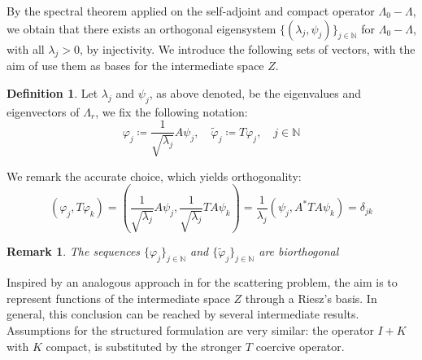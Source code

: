\documentclass[10pt, a4paper, twoside, openright]{book}
\theoremstyle{definition}
\newtheorem{definition}[subsection]{Definition}
\theoremstyle{plain}
\theoremstyle{plain}
\theoremstyle{plain}
\theoremstyle{plain}
\newtheorem{remark}[subsection]{Remark}
\theoremstyle{plain}
\theoremstyle{plain}
\theoremstyle{plain}
\theoremstyle{plain}
\let\phi\varphi
\begin{document}
By the spectral theorem applied on the self-adjoint and compact operator $\Lambda_0- \Lambda$, we obtain that there exists
an orthogonal eigensystem $\{(\lambda_j, \psi_j)\}_{j\in\mathbb{N}}$ for $\Lambda_0 - \Lambda$,
with all $\lambda_j>0$, by injectivity.
We introduce the following sets of vectors, with the aim of use them as bases for the intermediate space $Z$.
\begin{definition}
Let $\lambda_j$ and $\psi_j$, as above denoted, be the eigenvalues and eigenvectors of $\Lambda_r$, we fix the following notation:
\begin{equation}
 \phi_j\coloneqq \frac{1}{\sqrt{\lambda_j}}A\psi_j, \quad \tilde{\phi}_j\coloneqq T\phi_j,\quad j\in\mathbb{N} 
\end{equation}
\end{definition}
We remark the accurate choice, which yields orthogonality:
\begin{equation}
 (\phi_j, T\phi_k) =  ( \frac{1}{\sqrt{\lambda_j}} A\psi_j, \frac{1}{\sqrt{\lambda_j}} TA\psi_k) = \frac{1}{\lambda_j}( \psi_j, A^*TA\psi_k) = \delta_{jk}
\end{equation}
\begin{remark}
 The sequences $\{\phi_j\}_{j\in\mathbb{N}}$ and $\{\tilde{\phi}_j\}_{j\in\mathbb{N}}$ are biorthogonal
\end{remark}
Inspired by an analogous approach in \cite{kirsch:shape-1998} for the scattering problem, the aim is to represent functions of the intermediate space $Z$ through a Riesz's basis.
In general, this conclusion can be reached by several intermediate results. Assumptions for the structured formulation are very similar: the operator $I+K$ with $K$ compact, is substituted by the stronger $T$ coercive operator.
\end{document}
